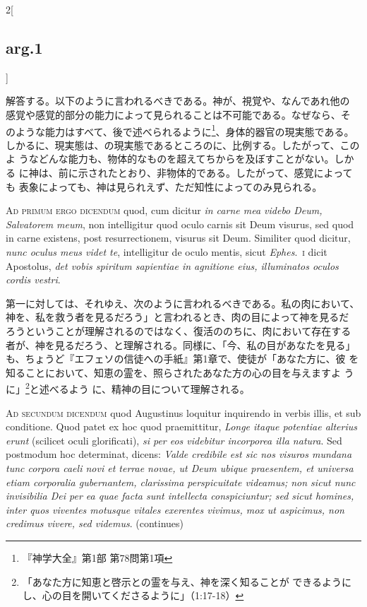 \documentclass[paper=a4paper,fontsize=10pt,jafontsize=9pt,titlepage]{jlreq}
\begin{document}
\begin{paracol}{2}[\subsection{arg.1}]
\switchcolumn

解答する。以下のように言われるべきである。神が、視覚や、なんであれ他の
感覚や感覚的部分の能力によって見られることは不可能である。なぜなら、そ
のような能力はすべて、後で述べられるように\footnote{『神学大全』第1部
第78問第1項}、身体的器官の現実態である。しかるに、現実態は、の現実態であるところのに、比例する。したがって、このよ
うなどんな能力も、物体的なものを超えてちからを及ぼすことがない。しかる
に神は、前に示されたとおり、非物体的である。したがって、感覚によっても
表象によっても、神は見られえず、ただ知性によってのみ見られる。

\switchcolumn*[\subsection{ad.1}]

{\scshape Ad primum ergo dicendum} quod, cum dicitur {\itshape in carne mea
videbo Deum, Salvatorem meum}, non intelligitur quod oculo carnis sit
Deum visurus, sed quod in carne existens, post resurrectionem, visurus
sit Deum. Similiter quod dicitur, {\itshape nunc oculus meus videt te},
intelligitur de oculo mentis, sicut {\itshape Ephes}.\ {\scshape i} dicit
Apostolus, {\itshape det vobis spiritum sapientiae in agnitione eius,
illuminatos oculos cordis vestri}.

\switchcolumn

第一に対しては、それゆえ、次のように言われるべきである。私の肉において、
神を、私を救う者を見るだろう」と言われるとき、肉の目によって神を見るだ
ろうということが理解されるのではなく、復活ののちに、肉において存在する
者が、神を見るだろう、と理解される。同様に、「今、私の目があなたを見る」
も、ちょうど『エフェソの信徒への手紙』第1章で、使徒が「あなた方に、彼
を知ることにおいて、知恵の霊を、照らされたあなた方の心の目を与えますよ
うに」\footnote{「あなた方に知恵と啓示との霊を与え、神を深く知ることが
できるようにし、心の目を開いてくださるように」（1:17-18）}と述べるよう
に、精神の目について理解される。

\switchcolumn*[\subsection{ad.2}]

{\scshape Ad secundum dicendum} quod Augustinus loquitur inquirendo in
verbis illis, et sub conditione. Quod patet ex hoc quod praemittitur,
{\itshape Longe itaque potentiae alterius erunt} (scilicet oculi
glorificati), {\itshape si per eos videbitur incorporea illa natura}. Sed
postmodum hoc determinat, dicens: {\itshape Valde credibile est sic nos
visuros mundana tunc corpora caeli novi et terrae novae, ut Deum
ubique praesentem, et universa etiam corporalia gubernantem,
clarissima perspicuitate videamus; non sicut nunc invisibilia Dei per
ea quae facta sunt intellecta conspiciuntur; sed sicut homines, inter
quos viventes motusque vitales exerentes vivimus, mox ut aspicimus,
non credimus vivere, sed videmus}. (continues)


\end{paracol}
\end{document}
